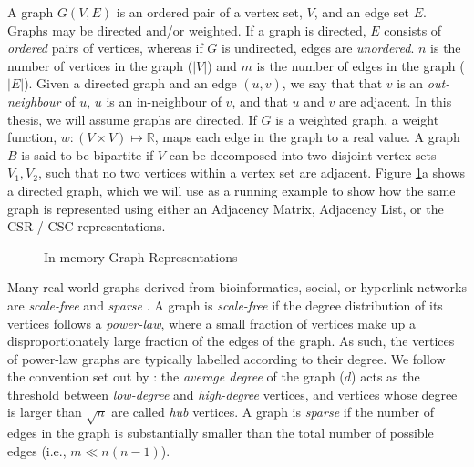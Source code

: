 A graph $G(V, E)$ is an ordered pair of a vertex set, $V$, and an edge set $E$. Graphs may be directed and/or weighted. If a graph is directed, $E$ consists of \textit{ordered} pairs of vertices, whereas if $G$ is undirected, edges are \textit{unordered}.
$n$ is the number of vertices in the graph ($|V|$) and $m$ is the number of edges in the graph ($|E|$).
Given a directed graph and an edge $(u,v)$, we say that that $v$ is an \textit{out-neighbour} of $u$, $u$ is an in-neighbour of $v$, and that $u$ and $v$ are adjacent. In this thesis, we will assume graphs are directed.
If $G$ is a weighted graph, a weight function, $w: (V \times V) \mapsto \mathbb{R}$, maps each edge in the graph to a real value. A graph $B$ is said to be bipartite if $V$ can be decomposed into two disjoint vertex sets $V_1, V_2$, such that no two vertices within a vertex set are adjacent.
Figure \ref{fig:graph_example}a shows a directed graph, which we will use as a running example to show how the same graph is represented using either an Adjacency Matrix, Adjacency List, or the \ac{CSR} / \ac{CSC} representations.



\begin{figure}[!htb]
    \begin{adjustwidth}{-0.75in}{-0.75in}
        \centering
        
        \caption{
            In-memory Graph Representations
        }
        \label{fig:graph_example}   %
    \end{adjustwidth}
\end{figure}


Many real world graphs derived from bioinformatics, social, or hyperlink networks are
\textit{scale-free} \cite{barabasi2009scale, sapco} and \textit{sparse} \cite{danisch2018listing}.
A graph is \textit{scale-free} if the degree distribution of its vertices follows a \textit{power-law}, where a small fraction of vertices make up a disproportionately large fraction of the edges of the graph. As such, the vertices of power-law graphs are typically labelled according to their degree. We follow the convention set out by \citet{esfahani2021locality}: the \textit{average degree} of the graph ($\overline{d}$) acts as the threshold between 
\textit{low-degree} and \textit{high-degree} vertices, and vertices whose degree is larger than $\sqrt{n}$ are called \textit{hub} vertices. 
A graph is \textit{sparse} if the number of edges in the graph is substantially smaller than the total number of possible edges (i.e., $m \ll n(n-1)$). 

